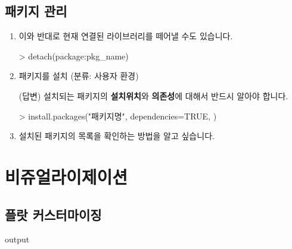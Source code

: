 \documentclass{report}
\begin{document}
\section{패키지 관리}
\begin{enumerate}
\item 	이와 반대로 현재 연결된 라이브러리를 떼어낼 수도 있습니다. 

	\begin{Schunk}
	\begin{Soutput}
	> detach(package:pkg_name)	
	\end{Soutput}
	\end{Schunk}


	\item 패키지를 설치 (분류: 사용자 환경)  
	
	\textsf{(답변)} 설치되는 패키지의 \textbf{설치위치}와 \textbf{의존성}에 대해서 반드시 알아야 합니다. 
	
	\begin{Schunk}
	\begin{Soutput}
	> install.packages("패키지명", dependencies=TRUE, )
	\end{Soutput}
	\end{Schunk}

	\item 설치된 패키지의 목록을 확인하는 방법을 알고 싶습니다.
\end{enumerate}


%
%

\chapter{비쥬얼라이제이션}

\section{플랏 커스터마이징}
\begin{Schunk}
\begin{Soutput}
output
\end{Soutput}
\end{Schunk}
\end{document}
